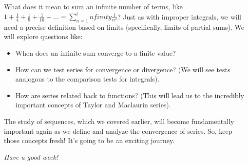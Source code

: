 \documentclass[11pt]{article}
\def\infty{infinity}%
\theoremstyle{definition}
\begin{document}
What does it mean to sum an infinite number of terms, like $1 + \frac{1}{4} + \frac{1}{9} + \frac{1}{16} + \dots = \sum_{n=1}^\infty \frac{1}{n^2}$? Just as with improper integrals, we will need a precise definition based on limits (specifically, limits of partial sums). We will explore questions like:
\begin{itemize}
    \item When does an infinite sum converge to a finite value?
    \item How can we test series for convergence or divergence? (We will see tests analogous to the comparison tests for integrals).
    \item How are series related back to functions? (This will lead us to the incredibly important concepts of Taylor and Maclaurin series).
\end{itemize}
The study of sequences, which we covered earlier, will become fundamentally important again as we define and analyze the convergence of series. So, keep those concepts fresh! It's going to be an exciting journey.

\textit{Have a good week!}
\end{document}
